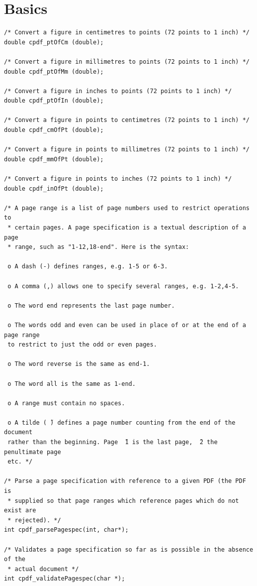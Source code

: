 \documentclass[a4paper]{memoir}
\begin{document}
\chapter{Basics}

\begin{small}
\begin{lstlisting}
/* Convert a figure in centimetres to points (72 points to 1 inch) */
double cpdf_ptOfCm (double);

/* Convert a figure in millimetres to points (72 points to 1 inch) */
double cpdf_ptOfMm (double);

/* Convert a figure in inches to points (72 points to 1 inch) */
double cpdf_ptOfIn (double);

/* Convert a figure in points to centimetres (72 points to 1 inch) */
double cpdf_cmOfPt (double);

/* Convert a figure in points to millimetres (72 points to 1 inch) */
double cpdf_mmOfPt (double);

/* Convert a figure in points to inches (72 points to 1 inch) */
double cpdf_inOfPt (double);

/* A page range is a list of page numbers used to restrict operations to
 * certain pages. A page specification is a textual description of a page
 * range, such as "1-12,18-end". Here is the syntax:

 o A dash (-) defines ranges, e.g. 1-5 or 6-3.

 o A comma (,) allows one to specify several ranges, e.g. 1-2,4-5.

 o The word end represents the last page number.

 o The words odd and even can be used in place of or at the end of a page range
 to restrict to just the odd or even pages.

 o The word reverse is the same as end-1.

 o The word all is the same as 1-end.

 o A range must contain no spaces.

 o A tilde ( ̃) defines a page number counting from the end of the document
 rather than the beginning. Page  ̃1 is the last page,  ̃2 the penultimate page
 etc. */

/* Parse a page specification with reference to a given PDF (the PDF is
 * supplied so that page ranges which reference pages which do not exist are
 * rejected). */
int cpdf_parsePagespec(int, char*);

/* Validates a page specification so far as is possible in the absence of the
 * actual document */
int cpdf_validatePagespec(char *);


\end{lstlisting}
\end{small}
\end{document}
